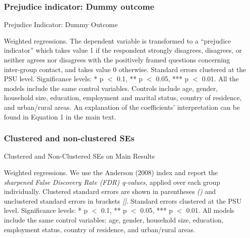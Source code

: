 \documentclass[a4paper,12pt]{article}
\renewcommand{\footnotesize}{\fontsize{8pt}{9pt}\selectfont}
\begin{document}
\begin{appendix}
\vspace{5mm}

  \subsubsection{Prejudice indicator: Dummy outcome}

		\begin{table}[H]
	\footnotesize
	\caption{Prejudice Indicator: Dummy Outcome}
	\label{tab:main_disagg_dummy}
	\centering
	\begin{threeparttable}
		\centering
		
	\begin{tablenotes}
		\footnotesize
		\item Weighted regressions. The dependent variable is transformed to a ``prejudice indicator'' which takes value 1 if the respondent strongly disagrees, disagrees, or neither agrees nor disagrees with the positively framed questions concerning inter-group contact, and takes value 0 otherwise. Standard errors clustered at the PSU level. Significance levels: * p $<$ 0.1, ** p $<$ 0.05, *** p $<$ 0.01. All the models include the same control variables. Controls include age, gender, household size, education, employment and marital status, country of residence, and urban/rural areas. An explanation of the coefficients' interpretation can be found in Equation 1 in the main text. 
	\end{tablenotes}
	\end{threeparttable}
\end{table} 


\subsubsection{Clustered and non-clustered SEs}\label{annex:nses}

	\setstretch{1}
\begin{table}[H]
	\footnotesize
	\caption{Clustered and Non-Clustered SEs on Main Results}
	\label{tab:nses} 
	\centering
	\begin{threeparttable}
		
		\begin{tablenotes}
			\footnotesize
			\item Weighted regressions. We use the Anderson (2008) index and report the \cite{anderson2008multiple} \textit{sharpened False Discovery Rate (FDR) q-values}, applied over each group individually. Clustered standard errors are shown in parentheses \textit{()} and unclustered standard errors in brackets \textit{[]}.  Standard errors clustered at the PSU level. Significance levels: * p $<$ 0.1, ** p $<$ 0.05, *** p $<$ 0.01. All  models include the same control variables: age, gender, household size, education, employment status, country of residence, and urban/rural areas. 
		\end{tablenotes}
		\end{threeparttable}
\end{table} 



\end{appendix}
\end{document}
